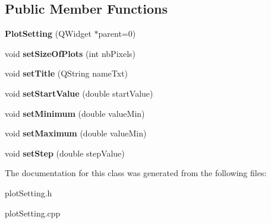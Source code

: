 \subsection*{Public Member Functions}
\begin{DoxyCompactItemize}
\item 
\mbox{\label{class_plot_setting_a3d80a7541225518d56a0e02901d8b2bd}} 
{\bfseries Plot\+Setting} (Q\+Widget $\ast$parent=0)
\item 
\mbox{\label{class_plot_setting_a1f3f91b9c3bd8c70163b41a99d4873dc}} 
void {\bfseries set\+Size\+Of\+Plots} (int nb\+Pixels)
\item 
\mbox{\label{class_plot_setting_a5b9fcff833c35f71f366f081b92794aa}} 
void {\bfseries set\+Title} (Q\+String name\+Txt)
\item 
\mbox{\label{class_plot_setting_a622b031dccb999b2c6c427fbd6501ccc}} 
void {\bfseries set\+Start\+Value} (double start\+Value)
\item 
\mbox{\label{class_plot_setting_ac55e0549e129997f0880e5858b908e67}} 
void {\bfseries set\+Minimum} (double value\+Min)
\item 
\mbox{\label{class_plot_setting_a8dce914c3d569b31e9b5aa234e2b28cf}} 
void {\bfseries set\+Maximum} (double value\+Min)
\item 
\mbox{\label{class_plot_setting_af2dfcb50308671a701c8511acc656b1d}} 
void {\bfseries set\+Step} (double step\+Value)
\end{DoxyCompactItemize}


The documentation for this class was generated from the following files\+:\begin{DoxyCompactItemize}
\item 
plot\+Setting.\+h\item 
plot\+Setting.\+cpp\end{DoxyCompactItemize}
